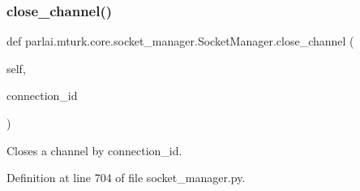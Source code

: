 \subsubsection{\texorpdfstring{close\+\_\+channel()}{close\_channel()}}
{\footnotesize\ttfamily def parlai.\+mturk.\+core.\+socket\+\_\+manager.\+Socket\+Manager.\+close\+\_\+channel (\begin{DoxyParamCaption}\item[{}]{self,  }\item[{}]{connection\+\_\+id }\end{DoxyParamCaption})}

\begin{DoxyVerb}Closes a channel by connection_id.
\end{DoxyVerb}
 

Definition at line 704 of file socket\+\_\+manager.\+py.



